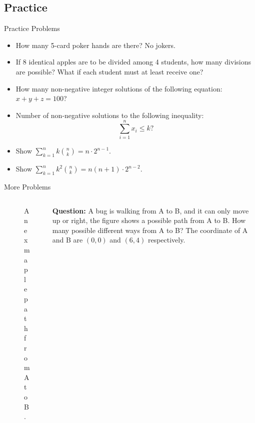 \subsection{Practice}
\begin{frame}{Practice Problems}
\begin{itemize}
    \item How many 5-card poker hands are there? No jokers.
    \pause
    \item If 8 identical apples are to be divided among 4 students, how many divisions are possible? What if each student must at least receive one?
    
    \item How many non-negative integer solutions of the following equation: $x+y+z=100$?
   
    \item Number of non-negative solutions to the following inequality:
    \[\sum_{i=1}^n x_i\leq k?\]\pause
     \item Show $\sum_{k=1}^n k\binom{n}{k}=n\cdot 2^{n-1}.$
    \item Show $\sum_{k=1}^n k^2\binom{n}{k}=n(n+1)\cdot 2^{n-2}.$
\end{itemize}
    
\end{frame}

\begin{frame}{More Problems}

\begin{columns}
\begin{column}{0.5\textwidth}
\begin{figure}[ht]
    \centering
    

    \caption{An exmaple path from A to B.}
    \label{fig: Counting path}
\end{figure}
\end{column}
\begin{column}{0.5\textwidth}
\textbf{Question:} A bug is walking from A to B, and it can only move up or right, the figure shows a possible path from A to B. How many possible different ways from A to B? The coordinate of A and B are $(0,0)$ and $(6,4)$ respectively. 
\end{column}
\end{columns}
\end{frame}
